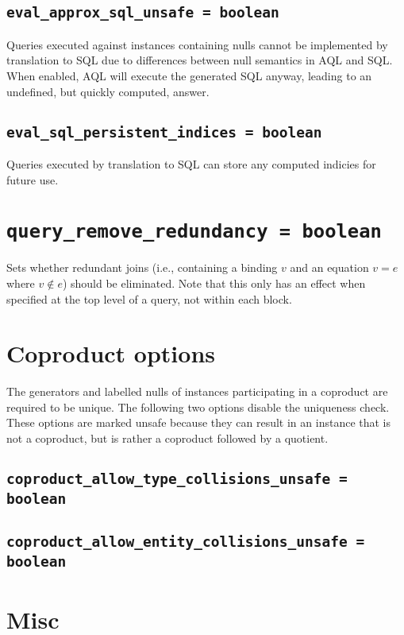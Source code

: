 \documentclass[10pt]{book}
\begin{document}
\subsection{{\tt eval\_approx\_sql\_unsafe = boolean}}

Queries executed against instances containing nulls cannot be implemented by translation to SQL due to differences between null semantics in AQL and SQL.  
When enabled, AQL will execute the generated SQL anyway, leading to an undefined, but quickly computed, answer.  

\subsection{{\tt eval\_sql\_persistent\_indices = boolean}}

Queries executed by translation to SQL can store any computed indicies for future use. 

\section{{\tt query\_remove\_redundancy = boolean}}

Sets whether redundant joins (i.e., containing a binding $v$ and an equation $v = e$ where $v \notin e$) should be eliminated.  Note that this only has an effect when specified at the top level of a query, not within each block.
\section{Coproduct options}

The generators and labelled nulls of instances participating in a coproduct are required to be unique.  The following two options disable the uniqueness check.  These options are marked unsafe because they can result in an instance that is not a coproduct, but is rather a coproduct followed by a quotient.

\subsection{{\tt coproduct\_allow\_type\_collisions\_unsafe = boolean}}

\subsection{{\tt coproduct\_allow\_entity\_collisions\_unsafe = boolean}}

\section{Misc}
\end{document}
